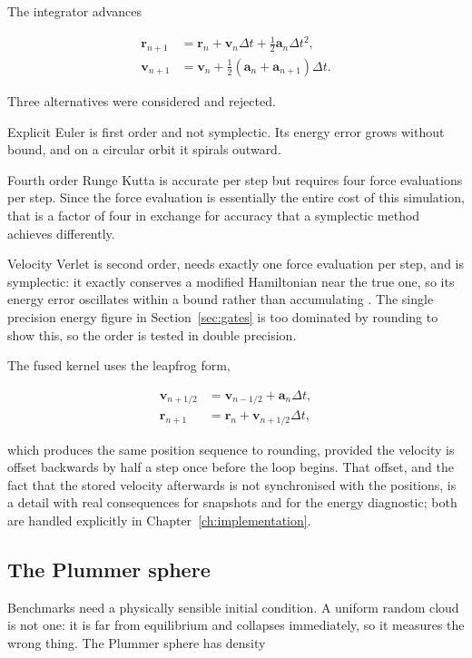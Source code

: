 The integrator advances

\begin{align}
  \mathbf{r}_{n+1} &= \mathbf{r}_n + \mathbf{v}_n \Delta t
                      + \tfrac{1}{2}\mathbf{a}_n \Delta t^2, \\
  \mathbf{v}_{n+1} &= \mathbf{v}_n
                      + \tfrac{1}{2}\left(\mathbf{a}_n + \mathbf{a}_{n+1}\right)\Delta t.
\end{align}

Three alternatives were considered and rejected.

Explicit Euler is first order and not symplectic. Its energy error grows
without bound, and on a circular orbit it spirals outward.

Fourth order Runge Kutta is accurate per step but requires four force
evaluations per step. Since the force evaluation is essentially the entire cost
of this simulation, that is a factor of four in exchange for accuracy that a
symplectic method achieves differently.

Velocity Verlet is second order, needs exactly one force evaluation per step,
and is symplectic: it exactly conserves a modified Hamiltonian near the true
one, so its energy error oscillates within a bound rather than accumulating
\cite{verlet1967,hairer2006}. The single precision energy figure in
Section~\ref{sec:gates} is too dominated by rounding to show this, so the order is tested
in double precision.

The fused kernel uses the leapfrog form,

\begin{align}
  \mathbf{v}_{n+1/2} &= \mathbf{v}_{n-1/2} + \mathbf{a}_n \Delta t, \\
  \mathbf{r}_{n+1}   &= \mathbf{r}_n + \mathbf{v}_{n+1/2} \Delta t,
\end{align}

which produces the same position sequence to rounding, provided the velocity is
offset backwards by half a step once before the loop begins. That offset, and
the fact that the stored velocity afterwards is not synchronised with the
positions, is a detail with real consequences for snapshots and for the energy
diagnostic; both are handled explicitly in Chapter~\ref{ch:implementation}.

\subsection{The Plummer sphere}

Benchmarks need a physically sensible initial condition. A uniform random cloud
is not one: it is far from equilibrium and collapses immediately, so it
measures the wrong thing. The Plummer sphere \cite{plummer1911} has density

